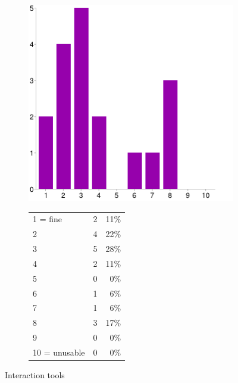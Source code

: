 \documentclass[MSc,paper=a4,pagesize=auto]{icldt}
\begin{document}
\begin{figure}[htbp!]
\centering
\begin{subfigure}{0.4\textwidth}
    \centering
    \includegraphics[width=1\linewidth]{resources/12-interaction_tools}
\end{subfigure}%
\centering
\begin{subfigure}{0.5\textwidth}
    \centering
   	\begin{tabular}{ l c r }
1 = fine&2&11\% \\
2&4&22\% \\
3&5&28\% \\
4&2&11\% \\
5&0&0\% \\
6&1&6\% \\
7&1&6\% \\
8&3&17\% \\
9&0&0\% \\
10 = unusable&0&0\% \\
\end{tabular}
\end{subfigure} 
    \caption{Interaction tools}
    \label{fig:12-interaction_tools}
\end{figure}
\end{document}
